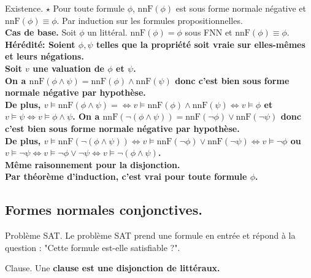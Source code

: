 \documentclass[french, 11pt]{article}
\newcommand*{\nnF}{\text{nnF}}
\begin{document}
\begin{prop}{Existence. $\star$}{}
    Pour toute formule $\phi$, $\nnF(\phi)$ est sous forme normale négative et $\nnF(\phi)\equiv\phi$.
    \tcblower
    Par induction sur les formules propositionnelles.\\
    \textbf{Cas de base.} Soit $\phi$ un littéral. $\nnF(\phi)=\phi$ sous FNN et $\nnF(\phi)\equiv\phi$.\\
    \bf{Hérédité:} Soient $\phi,\psi$ telles que la propriété soit vraie sur elles-mêmes et leurs négations.\\
    Soit $v$ une valuation de $\phi$ et $\psi$.\\
    On a $\nnF(\phi\land\psi)=\nnF(\phi)\land\nnF(\psi)$ donc c'est bien sous forme normale négative par hypothèse.\\
    De plus, $v\vDash\nnF(\phi \land \psi)=\iff v\vDash\nnF(\phi)\land\nnF(\psi)\iff v\vDash\phi$ et $v\vDash\psi\iff v\vDash\phi\land\psi$.\n
    On a $\nnF(\lnot(\phi\land\psi))=\nnF(\lnot\phi)\lor\nnF(\lnot\psi)$ donc c'est bien sous forme normale négative par hypothèse.\\
    De plus, $v\vDash\nnF(\lnot(\phi \land \psi)) \Leftrightarrow v\vDash\nnF(\lnot\phi)\lor\nnF(\lnot\psi)\Leftrightarrow v\vDash\lnot\phi$ ou $v\vDash\lnot\psi\Leftrightarrow v\vDash\lnot\phi\lor\lnot\psi\Leftrightarrow v\vDash\lnot(\phi \land \psi)$.\\
    Même raisonnement pour la disjonction.\\
    Par théorème d'induction, c'est vrai pour toute formule $\phi$.
\end{prop}

\vspace*{-0.7cm}

\subsection{Formes normales conjonctives.}

\begin{defi}{Problème SAT.}{}
    Le problème SAT prend une formule en entrée et répond à la question : "Cette formule est-elle satisfiable ?".
\end{defi}

\vspace*{-0.7cm}

\begin{defi}{Clause.}{}
    Une \bf{clause} est une disjonction de littéraux.
\end{defi}
\end{document}
